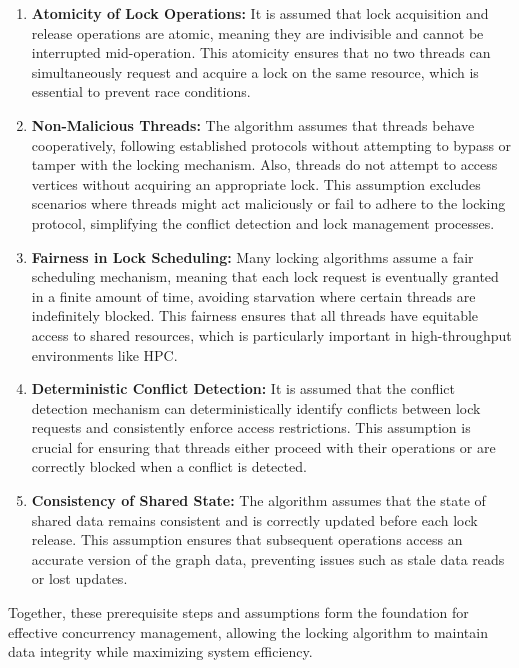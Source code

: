 \begin{enumerate}
    \item \textbf{Atomicity of Lock Operations:} It is assumed that lock acquisition and release operations are atomic, meaning they are indivisible and cannot be interrupted mid-operation. This atomicity ensures that no two threads can simultaneously request and acquire a lock on the same resource, which is essential to prevent race conditions.
    
    \item \textbf{Non-Malicious Threads:} The algorithm assumes that threads behave cooperatively, following established protocols without attempting to bypass or tamper with the locking mechanism. Also, threads do not attempt to access vertices without acquiring an appropriate lock. This assumption excludes scenarios where threads might act maliciously or fail to adhere to the locking protocol, simplifying the conflict detection and lock management processes.
    
    \item  \textbf{Fairness in Lock Scheduling:} Many locking algorithms assume a fair scheduling mechanism, meaning that each lock request is eventually granted in a finite amount of time, avoiding starvation where certain threads are indefinitely blocked. This fairness ensures that all threads have equitable access to shared resources, which is particularly important in high-throughput environments like HPC.

    \item \textbf{Deterministic Conflict Detection:}  It is assumed that the conflict detection mechanism can deterministically identify conflicts between lock requests and consistently enforce access restrictions. This assumption is crucial for ensuring that threads either proceed with their operations or are correctly blocked when a conflict is detected.
    
    \item \textbf{Consistency of Shared State:} The algorithm assumes that the state of shared data remains consistent and is correctly updated before each lock release. This assumption ensures that subsequent operations access an accurate version of the graph data, preventing issues such as stale data reads or lost updates.
\end{enumerate}


Together, these prerequisite steps and assumptions form the foundation for effective concurrency management, allowing the locking algorithm to maintain data integrity while maximizing system efficiency.


